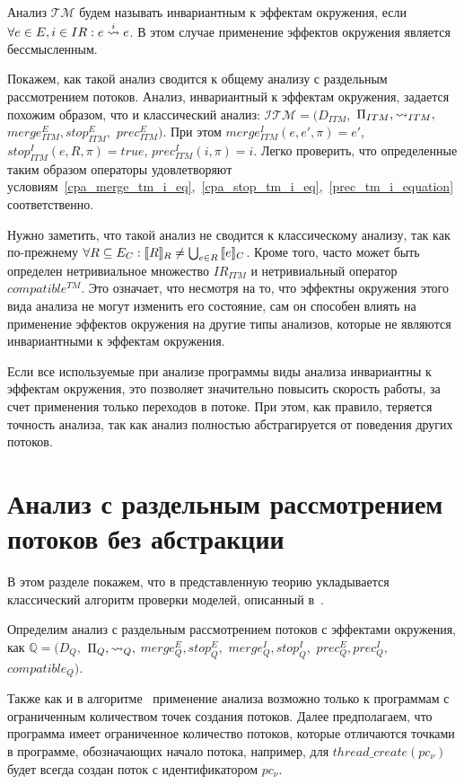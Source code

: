 Анализ $\mathcal{TM}$ будем называть инвариантным к эффектам окружения, если $\forall e \in E, i \in IR: e \stackrel{i}{\leadsto} e$.
В этом случае применение эффектов окружения является бессмысленным.

Покажем, как такой анализ сводится к общему анализу с раздельным рассмотрением потоков.
Анализ, инвариантный к эффектам окружения, задается похожим образом, что и классический анализ:
$\mathcal{ITM}=(D_{ITM},$ $\Pi_{ITM}, \leadsto_{ITM},$ $merge^E_{ITM}, stop^E_{ITM},$ $prec^E_{ITM})$.
При этом $merge^I_{ITM}(e,e',\pi)=e'$, $stop^I_{ITM}(e,R,\pi)=true$, $prec^I_{ITM}(i, \pi) = i$. 
Легко проверить, что определенные таким образом операторы удовлетворяют условиям~\ref{cpa_merge_tm_i_eq},~\ref{cpa_stop_tm_i_eq},~\ref{prec_tm_i_equation} соответственно.

Нужно заметить, что такой анализ не сводится к классическому анализу, так как по-прежнему $\forall R\subseteq E_C: [\![ R ]\!]_R \neq \bigcup_{e\in R}{[\![ e ]\!]_C}$.
Кроме того, часто может быть определен нетривиальное множество $IR_{ITM}$ и нетривиальный оператор $compatible^{TM}$. 
Это означает, что несмотря на то, что эффектны окружения этого вида анализа не могут изменить его состояние, сам он способен влиять на применение эффектов окружения на другие типы анализов, которые не являются инвариантными к эффектам окружения.

Если все используемые при анализе программы виды анализа инвариантны к эффектам окружения, это позволяет значительно повысить скорость работы, за счет применения только переходов в потоке.
При этом, как правило, теряется точность анализа, так как анализ полностью абстрагируется от поведения других потоков.

\section{Анализ с раздельным рассмотрением потоков без абстракции}

В этом разделе покажем, что в представленную теорию укладывается классический алгоритм проверки моделей, описанный в~\cite{ThreadModular03}.

Определим анализ с раздельным рассмотрением потоков с эффектами окружения, как
$\mathbb{Q}=(D_{Q},$ $\Pi_{Q}, \leadsto_{Q},$ $merge^E_{Q}, stop^E_{Q},$ $merge^I_{Q}, stop^I_{Q},$ $prec^E_{Q},prec^I_{Q},$ $compatible_{Q})$.

Также как и в алгоритме~\cite{ThreadModular03} применение анализа возможно только к программам с ограниченным количеством точек создания потоков. Далее предполагаем, что программа имеет ограниченное количество потоков, которые отличаются точками в программе, обозначающих начало потока, например, для $thread\_create(pc_\nu)$ будет всегда создан поток с идентификатором $pc_\nu$.


